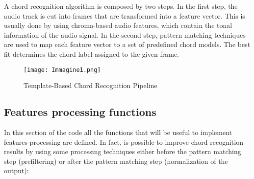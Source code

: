 \documentclass{article}
\begin{document}
A chord recognition algorithm is composed by two steps. In the first step, the audio track is cut into frames that are transformed into a feature vector. This is usually done by using chroma-based audio features, which contain the tonal information of the audio signal.
In the second step, pattern matching techniques are used to map each feature vector to a set of predefined chord models. The best fit determines the chord label assigned to the given frame.

\begin{figure}[H]
 \centering
 \texttt{[image: Immagine1.png]}
 \caption{Template-Based Chord Recognition Pipeline}
\end{figure}

\subsection*{Features processing functions}

In this section of the code all the functions that will be useful to implement features processing are defined. In fact, is possible to improve chord recognition results by using some processing techniques either before the pattern matching step (prefiltering) or after the pattern matching step (normalization of the output):
\end{document}
